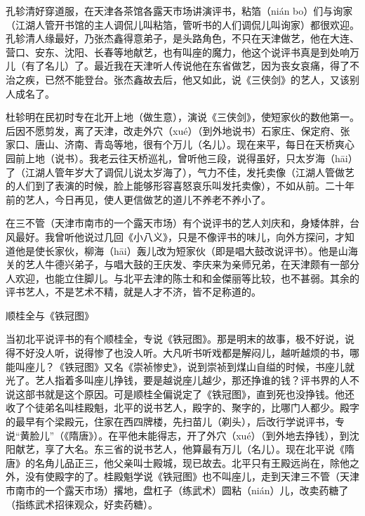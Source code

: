 \documentclass[12pt,UTF8]{ctexbook}
\begin{document}
孔轸清好穿道服，在天津各茶馆各露天市场讲演评书，粘箔（nián bo）们与询家（江湖人管开书馆的主人调侃儿叫粘箔，管听书的人们调侃儿叫询家）都很欢迎。孔轸清人缘最好，乃张杰鑫得意弟子，是头路角色，不只在天津做艺，他在大连、营口、安东、沈阳、长春等地献艺，也有叫座的魔力，他这个说评书真是到处响万儿（有了名儿）了。最近我在天津听人传说他在东省做艺，因为丧女哀痛，得了不治之疾，已然不能登台。张杰鑫故去后，他又如此，说《三侠剑》的艺人，又该别人成名了。

杜轸明在民初时专在北开上地（做生意），演说《三侠剑》，使短家伙的数他第一。后因不愿剪发，离了天津，改走外穴（xué）（到外地说书）石家庄、保定府、张家口、唐山、济南、青岛等地，很有个万儿（名儿）。现在来平，每日在天桥爽心园前上地（说书）。我老云往天桥巡礼，曾听他三段，说得虽好，只太岁海（hāi）了（江湖人管年岁大了调侃儿说太岁海了），气力不佳，发托卖像（江湖人管做艺的人们到了表演的时候，脸上能够形容喜怒哀乐叫发托卖像），不如从前。二十年前的艺人，今日再见，使人更信做艺的道儿不养老不养小了。

在三不管（天津市南市的一个露天市场）有个说评书的艺人刘庆和，身矮体胖，台风最好。我曾听他说过几回《小八义》，只是不像评书的味儿，向外方探问，才知道他是使长家伙，柳海（hāi）轰儿改为短家伙（即是唱大鼓改说评书）。他是山海关的艺人牛德兴弟子，与唱大鼓的王庆发、李庆来为亲师兄弟，在天津颇有一部分人欢迎，也能立住脚儿。与北平去津的陈士和和金傑丽等比较，也不甚弱。其余的评书艺人，不是艺术不精，就是人才不济，皆不足称道的。





顺桂全与《铁冠图》


当初北平说评书的有个顺桂全，专说《铁冠图》。那是明末的故事，极不好说，说得不好没人听，说得惨了也没人听。大凡听书听戏都是解闷儿，越听越烦的书，哪能叫座儿？《铁冠图》又名《崇祯惨史》，说到崇祯到煤山自缢的时候，书座儿就光了。艺人指着多叫座儿挣钱，要是越说座儿越少，那还挣谁的钱？评书界的人不说这部书就是这个原因。可是顺桂全偏说定了《铁冠图》，直到死也没挣钱。他还收了个徒弟名叫桂殿魁，北平的说书艺人，殿字的、聚字的，比哪门人都少。殿字的最早有个梁殿元，住家在西四牌楼，先扫苗儿（剃头），后改行学说评书，专说“黄脸儿”（《隋唐》）。在平他未能得志，开了外穴（xué）（到外地去挣钱），到沈阳献艺，享了大名。东三省的说书艺人，他算最有万儿（名儿）。现在北平说《隋唐》的名角儿品正三，他父亲叫士殿城，现已故去。北平只有王殿远尚在，除他之外，没有使殿字的了。桂殿魁学说《铁冠图》也不叫座儿，走到天津三不管（天津市南市的一个露天市场）撂地，盘杠子（练武术）圆粘（nián）儿，改卖药糖了（指练武术招徕观众，好卖药糖）。
\end{document}

